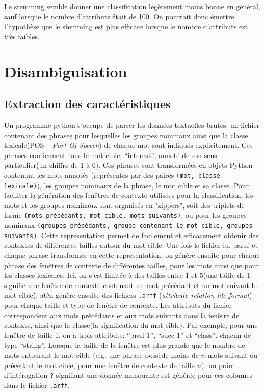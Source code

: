 \documentclass[11pt]{article} %
\begin{document}
Le stemming semble donner une classification légèrement moins bonne en général, sauf lorsque le nombre d'attributs était de 100. On pourrait donc émettre l'hypothèse que le stemming est plus efficace lorsque le nombre d'attributs est très faibles.

\section{ Disambiguisation }
\subsection{ Extraction des caractéristiques }
Un programme python s'occupe de parser les données textuelles brutes: un fichier contenant des phrases pour lesquelles 
les groupes nominaux ainsi que la classe lexicale(POS -- \emph{Part Of Speech}) de chaque mot sont indiqués explicitement.
Ces phrases contiennent tous le mot cible, ``interest'', annoté de son sens particulier(un chiffre de 1 à 6).
Ces phrases sont transformées en objets Python contenant les mots annotés
(représentés par des paires \texttt{(mot, classe lexicale)}), les groupes nominaux de la phrase, le mot cible et sa classe. 
Pour faciliter la génération des fenêtres de contexte utilisées pour la classification, 
les mots et les groupes nominaux sont organisés en "zippers", 
soit des triplets de forme \texttt{(mots précédants, mot cible, mots suivants)},
ou pour les groupes nominaux \texttt{(groupes précédants, groupe contenant le mot cible, groupes suivants)}. 
Cette représentation permet de facilement et efficacement obtenir des contextes de différentes tailles autour du mot cible.
Une fois le fichier lu, parsé et chaque phrase transformée en cette représentation,
on génère ensuite pour chaque phrase des fenêtres de contexte de différentes tailles, 
pour les mots ainsi que pour les classes lexicales.
Ici, on s'est limitée à des tailles entre 1 et 5(une taille de 1 signifie une fenêtre de contexte contenant un mot précédant et un mot suivant le mot cible).
aOn génère ensuite des fichiers \texttt{.arff} (\emph{attribute-relation file format}) pour chaque taille et type de fenêtre de contexte.
Les attributs du fichier correspondent aux mots précédants et aux mots suivants dans la fenêtre de contexte, ainsi que la classe(la signification du mot cible). Par exemple, pour une fenêtre de taille 1, on a trois attributs: ``pred-1'', ``succ-1'' et ``class'', chacun de type ``string''.
Lorsque la taille de la fenêtre est plus grande que le nombre de mots entourant le mot cible
(e.g. une phrase possède moins de $n$ mots suivant ou précédant le mot cible, pour une fenêtre de contexte de taille $n$),  
un point d'intérogation \texttt{?} signifiant une donnée manquante est générée pour ces colonnes dans le fichier \texttt{.arff}.
\end{document}
